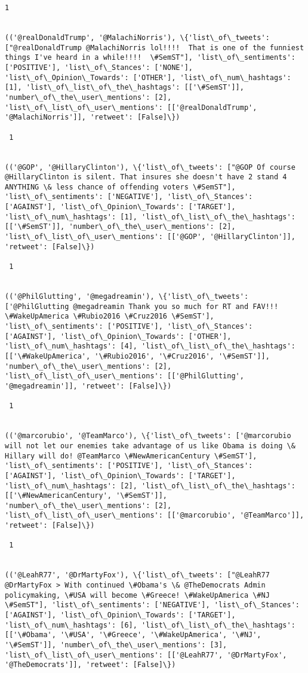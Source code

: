 \documentclass[11pt]{article}
\begin{document}
\begin{Verbatim}[commandchars=\\\{\}]
 1
 

(('@realDonaldTrump', '@MalachiNorris'), \{'list\_of\_tweets': ["@realDonaldTrump @MalachiNorris lol!!!!  That is one of the funniest things I've heard in a while!!!!  \#SemST"], 'list\_of\_sentiments': ['POSITIVE'], 'list\_of\_Stances': ['NONE'], 'list\_of\_Opinion\_Towards': ['OTHER'], 'list\_of\_num\_hashtags': [1], 'list\_of\_list\_of\_the\_hashtags': [['\#SemST']], 'number\_of\_the\_user\_mentions': [2], 'list\_of\_list\_of\_user\_mentions': [['@realDonaldTrump', '@MalachiNorris']], 'retweet': [False]\})

 1
 

(('@GOP', '@HillaryClinton'), \{'list\_of\_tweets': ["@GOP Of course @HillaryClinton is silent. That insures she doesn't have 2 stand 4 ANYTHING \& less chance of offending voters \#SemST"], 'list\_of\_sentiments': ['NEGATIVE'], 'list\_of\_Stances': ['AGAINST'], 'list\_of\_Opinion\_Towards': ['TARGET'], 'list\_of\_num\_hashtags': [1], 'list\_of\_list\_of\_the\_hashtags': [['\#SemST']], 'number\_of\_the\_user\_mentions': [2], 'list\_of\_list\_of\_user\_mentions': [['@GOP', '@HillaryClinton']], 'retweet': [False]\})

 1
 

(('@PhilGlutting', '@megadreamin'), \{'list\_of\_tweets': ['@PhilGlutting @megadreamin Thank you so much for RT and FAV!!! \#WakeUpAmerica \#Rubio2016 \#Cruz2016 \#SemST'], 'list\_of\_sentiments': ['POSITIVE'], 'list\_of\_Stances': ['AGAINST'], 'list\_of\_Opinion\_Towards': ['OTHER'], 'list\_of\_num\_hashtags': [4], 'list\_of\_list\_of\_the\_hashtags': [['\#WakeUpAmerica', '\#Rubio2016', '\#Cruz2016', '\#SemST']], 'number\_of\_the\_user\_mentions': [2], 'list\_of\_list\_of\_user\_mentions': [['@PhilGlutting', '@megadreamin']], 'retweet': [False]\})

 1
 

(('@marcorubio', '@TeamMarco'), \{'list\_of\_tweets': ['@marcorubio will not let our enemies take advantage of us like Obama is doing \& Hillary will do! @TeamMarco \#NewAmericanCentury \#SemST'], 'list\_of\_sentiments': ['POSITIVE'], 'list\_of\_Stances': ['AGAINST'], 'list\_of\_Opinion\_Towards': ['TARGET'], 'list\_of\_num\_hashtags': [2], 'list\_of\_list\_of\_the\_hashtags': [['\#NewAmericanCentury', '\#SemST']], 'number\_of\_the\_user\_mentions': [2], 'list\_of\_list\_of\_user\_mentions': [['@marcorubio', '@TeamMarco']], 'retweet': [False]\})

 1
 

(('@LeahR77', '@DrMartyFox'), \{'list\_of\_tweets': ["@LeahR77 @DrMartyFox > With continued \#Obama's \& @TheDemocrats Admin policymaking, \#USA will become \#Greece! \#WakeUpAmerica \#NJ \#SemST"], 'list\_of\_sentiments': ['NEGATIVE'], 'list\_of\_Stances': ['AGAINST'], 'list\_of\_Opinion\_Towards': ['TARGET'], 'list\_of\_num\_hashtags': [6], 'list\_of\_list\_of\_the\_hashtags': [['\#Obama', '\#USA', '\#Greece', '\#WakeUpAmerica', '\#NJ', '\#SemST']], 'number\_of\_the\_user\_mentions': [3], 'list\_of\_list\_of\_user\_mentions': [['@LeahR77', '@DrMartyFox', '@TheDemocrats']], 'retweet': [False]\})


\end{Verbatim}
\end{document}
